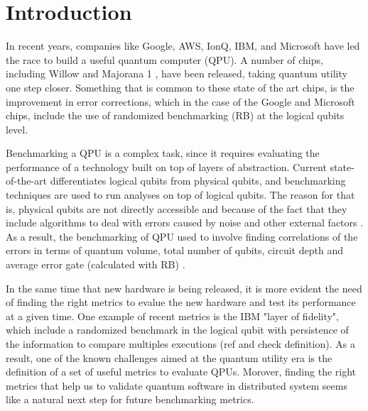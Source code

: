 \section*{Introduction}


In recent years, companies like Google, AWS, IonQ, IBM, and Microsoft have led the race to build a useful quantum computer (QPU). A number of chips, including Willow \cite{acharyaQuantumErrorCorrection2025_2025} and Majorana 1 \cite{aasenRoadmapFaultTolerant2025_2025}, have been released, taking quantum utility one step closer. Something that is common to these state of the art chips, is the improvement in error corrections, which in the case of the Google and Microsoft chips, include the use of randomized benchmarking (RB) at the logical qubits level.



Benchmarking a QPU is a complex task, since it requires evaluating the performance of a technology built on top of layers of abstraction. Current state-of-the-art differentiates logical qubits from physical qubits, and benchmarking techniques are used to run analyses on top of logical qubits. The reason for that is, physical qubits are not directly accessible and because of the fact that they include algorithms to deal with errors caused by noise and other external factors \cite{campbellRoadsFaulttolerantUniversal2017_2017, tomitaLowdistanceSurfaceCodes_2014}. As a result, the benchmarking of QPU used to involve finding correlations of the errors in terms of quantum volume, total number of qubits, circuit depth and average error gate (calculated with RB) \cite{proctorBenchmarkingQuantumComputers2025_2025}.


In the same time that new hardware is being released, it is more evident the need of finding the right metrics to evalue the new hardware and test its performance at a given time. One example of recent metrics is the IBM "layer of fidelity", which include a randomized benchmark in the logical qubit with persistence of the information to compare multiples executions (ref and check definition). As a result, one of the known challenges aimed at the quantum utility era is the definition of a set of useful metrics to evaluate QPUs. Morover, finding the right metrics that help us to validate quantum software in distributed system seems like a natural next step for future benchmarking metrics.


